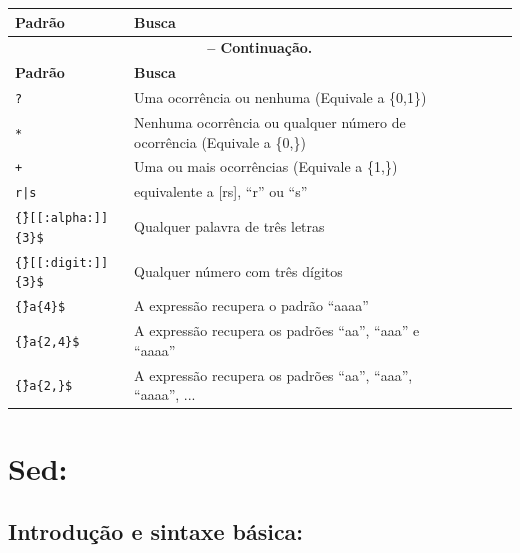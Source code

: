 \begin{refsection}
\begin{center}
\begin{longtable}{lllllll}
\hline\hline \textbf{Padrão} & \textbf{Busca}\\
\endfirsthead

\multicolumn{6}{c}{{\bfseries \tablename\ \thetable{} -- Continuação.}}\\
\hline\hline \textbf{Padrão} & \textbf{Busca}\\
\endhead
\hline \hline
\endlastfoot
\texttt{?} & Uma ocorrência ou nenhuma (Equivale a \{0,1\})\\
\texttt{*} & Nenhuma ocorrência ou qualquer número de ocorrência (Equivale a \{0,\})\\
\texttt{+} & Uma ou mais ocorrências (Equivale a \{1,\})\\
\texttt{r|s} & equivalente a [rs], ``r'' ou ``s''\\
\texttt{\^\{\}[[:alpha:]]\{3\}\$} & Qualquer palavra de três letras\\
\texttt{\^\{\}[[:digit:]]\{3\}\$}  & Qualquer número com três dígitos\\
\texttt{\^\{\}a\{4\}\$} & A expressão recupera o padrão ``aaaa''\\
\texttt{\^\{\}a\{2,4\}\$} & A expressão recupera os padrões ``aa'', ``aaa'' e ``aaaa''\\
\texttt{\^\{\}a\{2,\}\$} & A expressão recupera os padrões ``aa'', ``aaa'', ``aaaa'', ...\\

\end{longtable}
\end{center}


\section{Sed:}\label{tut2:sed}

\subsection{Introdução e sintaxe básica:}\label{tut2:sed:intro}


\end{refsection}
